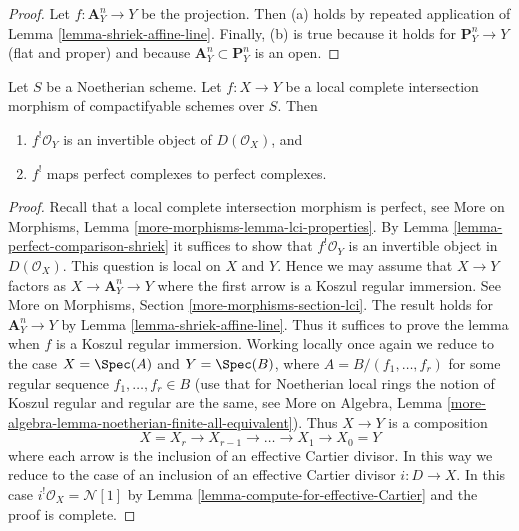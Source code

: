 \begin{proof}
\medskip\noindent
Let $f : \mathbf{A}^n_Y \to Y$ be the projection. Then (a) holds
by repeated application of Lemma \ref{lemma-shriek-affine-line}.
Finally, (b) is true because it holds for $\mathbf{P}^n_Y \to Y$
(flat and proper) and because $\mathbf{A}^n_Y \subset \mathbf{P}^n_Y$
is an open.
\end{proof}

\begin{lemma}
\label{lemma-lci-shriek}
Let $S$ be a Noetherian scheme. Let $f : X \to Y$ be a local complete
intersection morphism of compactifyable schemes over $S$. Then
\begin{enumerate}
\item $f^!\mathcal{O}_Y$ is an invertible object of $D(\mathcal{O}_X)$, and
\item $f^!$ maps perfect complexes to perfect complexes.
\end{enumerate}
\end{lemma}

\begin{proof}
Recall that a local complete intersection morphism is perfect, see
More on Morphisms, Lemma \ref{more-morphisms-lemma-lci-properties}.
By Lemma \ref{lemma-perfect-comparison-shriek} it suffices to show
that $f^!\mathcal{O}_Y$ is an invertible object in $D(\mathcal{O}_X)$.
This question is local on $X$ and $Y$. Hence we may assume that $X \to Y$
factors as $X \to \mathbf{A}^n_Y \to Y$ where the first arrow is a
Koszul regular immersion. See More on Morphisms, Section
\ref{more-morphisms-section-lci}.
The result holds for $\mathbf{A}^n_Y \to Y$
by Lemma \ref{lemma-shriek-affine-line}. Thus it suffices to prove
the lemma when $f$ is a Koszul regular immersion.
Working locally once again we reduce to the case
$X = \Spec(A)$ and $Y = \Spec(B)$, where $A = B/(f_1, \ldots, f_r)$
for some regular sequence $f_1, \ldots, f_r \in B$
(use that for Noetherian local rings the notion of Koszul
regular and regular are the same, see
More on Algebra, Lemma
\ref{more-algebra-lemma-noetherian-finite-all-equivalent}).
Thus $X \to Y$ is a composition
$$
X = X_r \to X_{r - 1} \to \ldots \to X_1 \to X_0 = Y
$$
where each arrow is the inclusion of an effective Cartier divisor.
In this way we reduce to the case of an inclusion of an effective
Cartier divisor $i : D \to X$. In this case
$i^!\mathcal{O}_X = \mathcal{N}[1]$ by
Lemma \ref{lemma-compute-for-effective-Cartier} and the proof is complete.
\end{proof}







